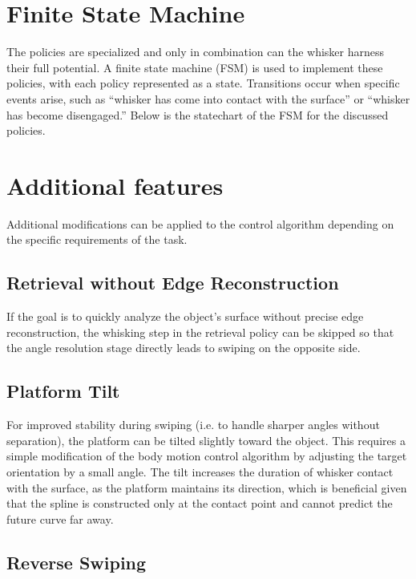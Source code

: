 \section{Finite State Machine}

The policies are specialized and only in combination can the whisker harness their full potential.
A finite state machine (FSM) is used to implement these policies, with each policy represented as a state.
Transitions occur when specific events arise, such as ``whisker has come into contact with the surface'' or ``whisker has become disengaged.''
Below is the statechart of the FSM for the discussed policies.


\section{Additional features}

Additional modifications can be applied to the control algorithm depending on the specific requirements of the task.

\subsection{Retrieval without Edge Reconstruction}

If the goal is to quickly analyze the object's surface without precise edge reconstruction, the whisking step in the retrieval policy can be skipped so that the angle resolution stage directly leads to swiping on the opposite side.

\subsection{Platform Tilt}

For improved stability during swiping (i.e. to handle sharper angles without separation), the platform can be tilted slightly toward the object.
This requires a simple modification of the body motion control algorithm by adjusting the target orientation by a small angle.
The tilt increases the duration of whisker contact with the surface, as the platform maintains its direction, which is beneficial given that the spline is constructed only at the contact point and cannot predict the future curve far away.

\subsection{Reverse Swiping}

